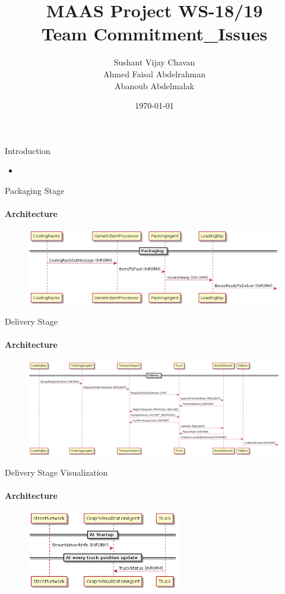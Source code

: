 \documentclass{beamer}
\title{MAAS Project WS-18/19 \\ Team Commitment\_Issues}
\author{Sushant Vijay Chavan\\Ahmed Faisal Abdelrahman\\Abanoub Abdelmalak}
\date{\today}
\let\olditem=\item%
\renewcommand{\item}{\olditem \justifying}%
\begin{document}
\maketitle

\begin{frame}{Introduction}
	\begin{itemize}
		\item 
	\end{itemize}
\end{frame}

\begin{frame}{Packaging Stage}
\framesubtitle{Architecture}
\begin{figure}[h!]
	\centering
	\includegraphics[width=\textwidth]{../Architecture/Architecture_Packaging.png}
\end{figure}
\end{frame}

\begin{frame}{Delivery Stage}
\framesubtitle{Architecture}
\begin{figure}[h!]
	\centering
	\includegraphics[width=\textwidth]{../Architecture/Architecture_Delivery.png}
\end{figure}
\end{frame}

\begin{frame}{Delivery Stage Visualization}
\framesubtitle{Architecture}
\begin{figure}[h!]
	\centering
	\includegraphics[width=0.6\textwidth]{../Architecture/Architecture_Visualization.png}
\end{figure}
\end{frame}
\end{document}
